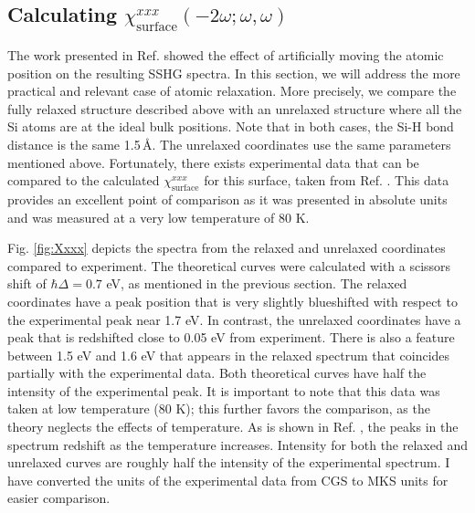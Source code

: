 
\subsection{Calculating 
\texorpdfstring{$\chi^{xxx}_{\mathrm{surface}}(-2\omega;\omega,\omega)$}{Xxxx}}
\label{sec:res1x1chi}

The work presented in Ref. \cite{mejiaPRB02} showed the effect of artificially
moving the atomic position on the resulting SSHG spectra. In this section, we
will address the more practical and relevant case of atomic relaxation. More
precisely, we compare the fully relaxed structure described above with an
unrelaxed structure where all the Si atoms are at the ideal bulk positions. Note
that in both cases, the Si-H bond distance is the same 1.5\,\AA. The unrelaxed
coordinates use the same parameters mentioned above. Fortunately, there exists
experimental data that can be compared to the calculated
$\chi^{xxx}_{\mathrm{surface}}$ for this surface, taken from Ref.
\cite{hoferAPA96}. This data provides an excellent point of comparison as it was
presented in absolute units and was measured at a very low temperature of 80 K.

Fig. \ref{fig:Xxxx} depicts the spectra from the relaxed and unrelaxed
coordinates compared to experiment. The theoretical curves were calculated with
a scissors shift of $\hbar\Delta = 0.7$ eV, as mentioned in the previous
section. The relaxed coordinates have a peak position that is very slightly
blueshifted with respect to the experimental peak near 1.7 eV. In contrast, the
unrelaxed coordinates have a peak that is redshifted close to 0.05 eV from
experiment. There is also a feature between 1.5 eV and 1.6 eV that appears in
the relaxed spectrum that coincides partially with the experimental data. Both
theoretical curves have half the intensity of the experimental peak. It is
important to note that this data was taken at low temperature (80 K); this
further favors the comparison, as the theory neglects the effects of
temperature. As is shown in Ref. \cite{hoferAPA96}, the peaks in the spectrum
redshift as the temperature increases. Intensity for both the relaxed and
unrelaxed curves are roughly half the intensity of the experimental spectrum. I
have converted the units of the experimental data from CGS to MKS units for
easier comparison.

